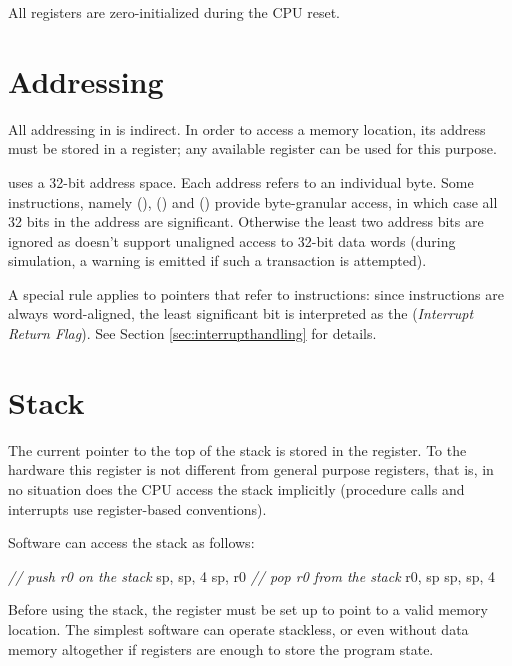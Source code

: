 \documentclass[a4paper,12pt,twoside,extrafontsizes]{memoir}
\begin{document}
All registers are zero-initialized during the CPU reset.

\section{Addressing}
\label{sec:addressing}

All addressing in \lxp{} is indirect. In order to access a memory location, its address must be stored in a register; any available register can be used for this purpose.

\lxp{} uses a 32-bit address space. Each address refers to an individual byte. Some instructions, namely  (),  () and  () provide  byte-granular access, in which case all 32 bits in the address are significant. Otherwise the least two address bits are ignored as \lxp{} doesn't support unaligned access to 32-bit data words (during simulation, a warning is emitted if such a transaction is attempted).

A special rule applies to pointers that refer to instructions: since instructions are always word-aligned, the least significant bit is interpreted as the  (\emph{Interrupt Return Flag}). See Section \ref{sec:interrupthandling} for details.

\section{Stack}
\label{sec:stack}

The current pointer to the top of the stack is stored in the  register. To the hardware this register is not different from general purpose registers, that is, in no situation does the CPU access the stack implicitly (procedure calls and interrupts use register-based conventions).

Software can access the stack as follows:

\begin{codepar}
    \emph{// push r0 on the stack}
     sp, sp, 4
     sp, r0
    \emph{// pop r0 from the stack}
     r0, sp
     sp, sp, 4
\end{codepar}

Before using the stack, the  register must be set up to point to a valid memory location. The simplest software can operate stackless, or even without data memory altogether if registers are enough to store the program state.
\end{document}
